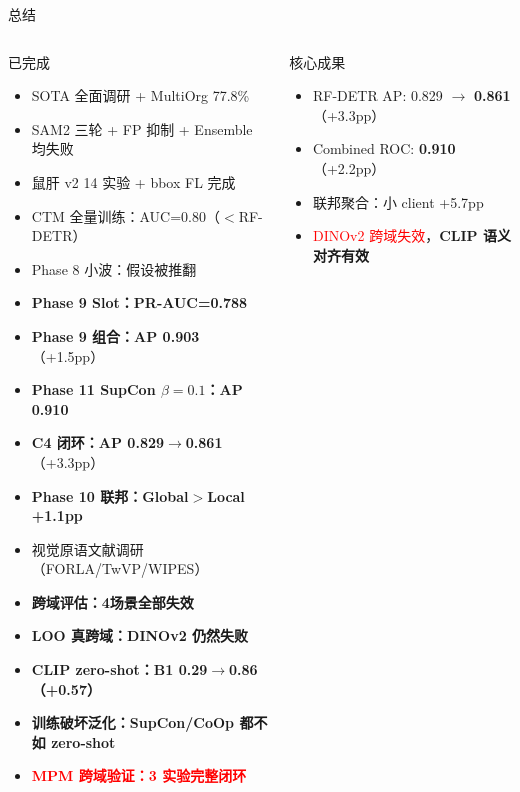 \documentclass[aspectratio=169, 10pt]{beamer}
\begin{document}
\begin{frame}{总结}
  \begin{columns}[T]
    \begin{block}{已完成}
      \begin{itemize}
        \item[\checkmark] SOTA 全面调研 + MultiOrg 77.8\%
        \item[\checkmark] SAM2 三轮 + FP 抑制 + Ensemble 均失败
        \item[\checkmark] 鼠肝 v2 14 实验 + bbox FL 完成
        \item[\checkmark] CTM 全量训练：AUC=0.80（$<$RF-DETR）
        \item[\checkmark] Phase 8 小波：假设被推翻
        \item[\checkmark] \textbf{Phase 9 Slot：PR-AUC=0.788}
        \item[\checkmark] \textbf{Phase 9 组合：AP 0.903}（+1.5pp）
        \item[\checkmark] \textbf{Phase 11 SupCon $\beta=0.1$：AP 0.910}
        \item[\checkmark] \textbf{C4 闭环：AP 0.829$\to$0.861}（+3.3pp）
        \item[\checkmark] \textbf{Phase 10 联邦：Global$>$Local +1.1pp}
        \item[\checkmark] 视觉原语文献调研（FORLA/TwVP/WIPES）
        \item[\checkmark] \textbf{跨域评估：4场景全部失效}
        \item[\checkmark] \textbf{LOO 真跨域：DINOv2 仍然失败}
        \item[\checkmark] \textbf{CLIP zero-shot：B1 0.29$\to$0.86（+0.57）}
        \item[\checkmark] \textbf{训练破坏泛化：SupCon/CoOp 都不如 zero-shot}
        \item[\checkmark] \textcolor{red}{\textbf{MPM 跨域验证：3 实验完整闭环}}
      \end{itemize}
    \end{block}
    \begin{alertblock}{核心成果}
      \begin{itemize}
        \item RF-DETR AP: 0.829 $\to$ \textbf{0.861}（+3.3pp）
        \item Combined ROC: \textbf{0.910}（+2.2pp）
        \item 联邦聚合：小 client +5.7pp
        \item \textcolor{red}{DINOv2 跨域失效}，\textbf{CLIP 语义对齐有效}

\end{itemize}
\end{alertblock}
\end{columns}
\end{frame}
\end{document}
